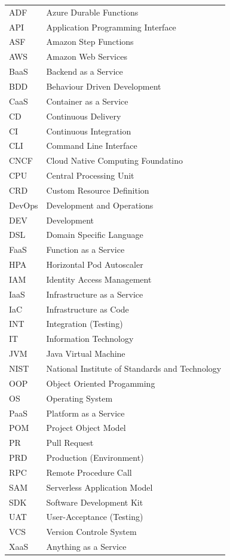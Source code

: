 \documentclass[11pt]{article}
\begin{document}
\begin{tabular}{ p{2cm} p{10cm}} 
ADF & Azure Durable Functions \\
API & Application Programming Interface \\
ASF & Amazon Step Functions \\
AWS & Amazon Web Services \\
BaaS & Backend as a Service \\
BDD & Behaviour Driven Development \\
CaaS & Container as a Service \\  
CD & Continuous Delivery \\  
CI & Continuous Integration \\
CLI & Command Line Interface \\
CNCF & Cloud Native Computing Foundatino \\
CPU & Central Processing Unit \\
CRD & Custom Resource Definition \\
DevOps & Development and Operations \\  
DEV & Development \\
DSL & Domain Specific Language \\
FaaS & Function as a Service \\ 
HPA & Horizontal Pod Autoscaler \\
IAM & Identity Access Management \\
IaaS & Infrastructure as a Service \\
IaC & Infrastructure as Code \\
INT & Integration (Testing) \\
IT & Information Technology \\
JVM & Java Virtual Machine \\
NIST & National Institute of Standards and Technology \\
OOP & Object Oriented Progamming \\
OS & Operating System \\
PaaS & Platform as a Service \\
POM & Project Object Model \\
PR & Pull Request \\
PRD & Production (Environment) \\
RPC & Remote Procedure Call \\
SAM & Serverless Application Model \\
SDK & Software Development Kit \\
UAT & User-Acceptance (Testing) \\
VCS & Version Controle System \\
XaaS & Anything as a Service \\
\end{tabular}
\newpage
\tableofcontents
\newpage
\end{document}
